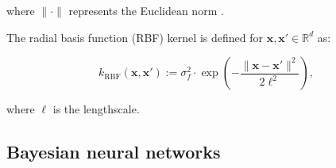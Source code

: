 where $\|\cdot\|$ represents the Euclidean norm \citep{gauche}. 

The radial basis function (RBF) kernel is defined for
$\mathbf{x}, \mathbf{x}' \in \mathbb{R}^d$ as:

$$
k_{\text{RBF}}(\mathbf{x}, \mathbf{x}') := \sigma_f^2 \cdot \exp\left(-\frac{\|\mathbf{x} - \mathbf{x}'\|^2}{2\ell^2}\right),
$$

where $\ell$ is the lengthscale.


\subsection{Bayesian neural networks}
